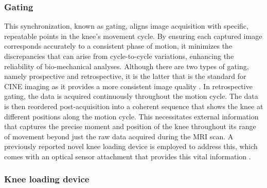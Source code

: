 \documentclass{micro-econ-thesis}
\begin{document}
\subsubsection{Gating} 

This synchronization, known as gating, aligns image acquisition with specific, repeatable points in the knee's movement cycle. By ensuring each captured image corresponds accurately to a consistent phase of motion, it minimizes the discrepancies that can arise from cycle-to-cycle variations, enhancing the reliability of bio-mechanical analyses. Although there are two types of gating, namely prospective and retrospective, it is the latter that is the standard for CINE imaging as it provides a more consistent image quality \parencite[p. 102]{edelman_clinical_1996}. In retrospective gating, the data is acquired continuously throughout the motion cycle. The data is then reordered post-acquisition into a coherent sequence that shows the knee at different positions along the motion cycle. This necessitates external information that captures the precise moment and position of the knee throughout its range of movement beyond just the raw data acquired during the MRI scan. A previously reported novel knee loading device is employed to address this, which comes with an optical sensor attachment that provides this vital information \parencite{brisson_novel_2022}. 

\subsubsection{Knee loading device }
\end{document}
